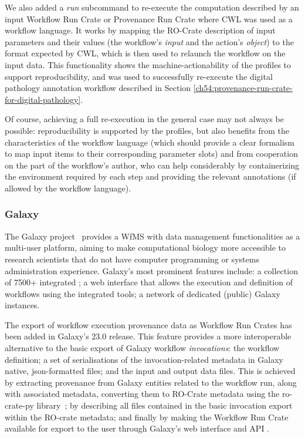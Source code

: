 We also added a \emph{run} subcommand to re-execute the computation described by an input Workflow Run Crate or Provenance Run Crate where CWL was used as a workflow language.
It works by mapping the RO-Crate description of input parameters and their values (the workflow's
\emph{input} and the action's \emph{object}) to the format expected by CWL, which is then used to relaunch the workflow on the input data.
This functionality shows the machine-actionability of the profiles to support reproducibility, and was used to successfully re-execute the digital pathology annotation workflow described in Section \vref{ch54:provenance-run-crate-for-digital-pathology}.

Of course, achieving a full re-execution in the general case may not always be possible: reproducibility is supported by the profiles, but also benefits from the characteristics of the workflow language (which should provide a clear formalism to map input items to their corresponding parameter slots) and from cooperation on the part of the workflow's author, who can help considerably by containerizing the environment required by each step and providing the relevant annotations (if allowed by the workflow language).


\subsubsection{Galaxy}\label{ch54:galaxy}

The Galaxy project~\cite{Galaxy 2022} provides a WfMS with data management functionalities as a multi-user platform, aiming to make computational biology more accessible to research scientists that do not have computer programming or systems administration experience.
Galaxy's most prominent features include: a collection of 7500+ integrated ;
a web interface that allows the execution and definition of workflows using the integrated tools; a network of dedicated (public) Galaxy instances.

The export of workflow execution provenance data as Workflow Run Crates has been added in Galaxy's 23.0 release.
This feature provides a more interoperable alternative to the basic export of Galaxy workflow
\emph{invocations}: the workflow definition; a set of serialisations of the invocation-related metadata in Galaxy native, json-formatted files;
and the input and output data files.
This is achieved by extracting provenance from Galaxy entities related to the workflow run, along with associated metadata, converting them to RO-Crate metadata using the ro-crate-py library~\cite{De Geest 2023a}; by describing all files contained in the basic invocation export within the RO-crate metadata;
and finally by making the Workflow Run Crate available for export to the user through Galaxy's web interface and API \cite{De Geest 2022}.

